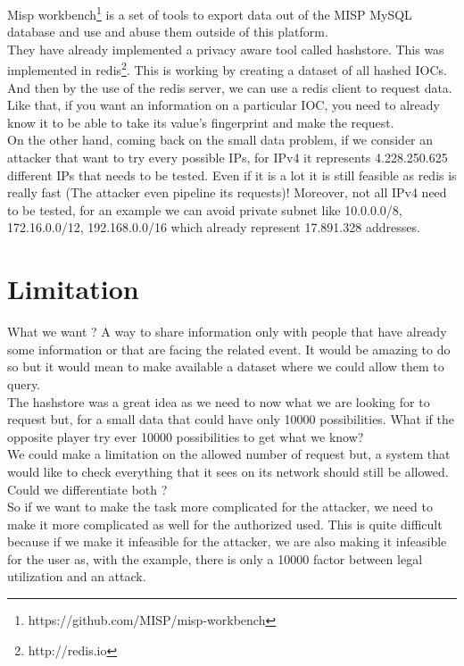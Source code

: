 \documentclass{eplmastersthesis}
\begin{document}
Misp workbench\footnote{https://github.com/MISP/misp-workbench} is a set of tools to export data out of the MISP MySQL database and use and abuse them outside of this platform.\\

They have already implemented a privacy aware tool called hashstore. This was implemented in redis\footnote{http://redis.io}. This is working by creating a dataset of all hashed IOCs. And then by the use of the redis server, we can use a redis client to request data.\\
Like that, if you want an information on a particular IOC, you need to already know it to be able to take its value's fingerprint and make the request.\\
On the other hand, coming back on the small data problem, if we consider an attacker that want to try every possible IPs, for IPv4 it represents 4.228.250.625 different IPs that needs to be tested. Even if it is a lot it is still feasible as redis is really fast (The attacker even pipeline its requests)! Moreover, not all IPv4 need to be tested, for an example we can avoid private subnet like 10.0.0.0/8, 172.16.0.0/12, 192.168.0.0/16 which already represent 17.891.328 addresses.


\section{Limitation}

What we want ? A way to share information only with people that have already some information or that are facing the related event. It would be amazing to do so but it would mean to make available a dataset where we could allow them to query.\\
The hashstore was a great idea as we need to now what we are looking for to request but, for a small data that could have only 10000 possibilities. What if the opposite player try ever 10000 possibilities to get what we know? \\
We could make a limitation on the allowed number of request but, a system that would like to check everything that it sees on its network should still be allowed. Could we differentiate both ? \\
So if we want to make the task more complicated for the attacker, we need to make it more complicated as well for the authorized used. This is quite difficult because if we make it infeasible for the attacker, we are also making it infeasible for the user as, with the example, there is only a 10000 factor between legal utilization and an attack.\\
\end{document}
